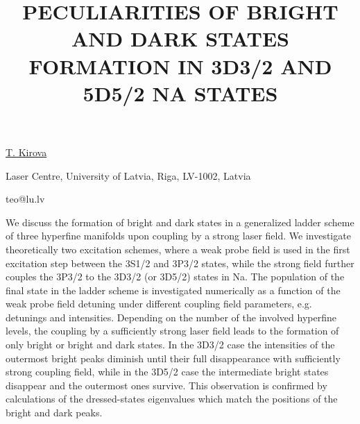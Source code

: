 \title{PECULIARITIES OF BRIGHT AND DARK STATES FORMATION IN 3D3/2 AND 5D5/2  NA STATES}

\underline{T. Kirova}

{\normalsize{\vspace{-4mm}
Laser Centre,
University of Latvia,
Riga, LV-1002,
Latvia

\email teo@lu.lv}}

We discuss the formation of bright and dark states in a generalized ladder scheme of three hyperfine
manifolds upon coupling by a strong laser field.  We investigate theoretically two excitation
schemes, where a weak probe field is used in the first excitation step between the 3S1/2 and 3P3/2
states, while the strong field further couples the 3P3/2 to the 3D3/2 (or 3D5/2) states in Na. The
population of the final state in the ladder scheme is investigated numerically as a function of the
weak probe field detuning under different coupling field parameters, e.g. detunings and intensities.
Depending on the number of the involved hyperfine levels, the coupling by a sufficiently strong
laser field leads to the formation of only bright or bright and dark states. In the 3D3/2 case the
intensities of the outermost bright peaks diminish until their full disappearance with sufficiently
strong coupling field, while in the 3D5/2 case the intermediate bright states disappear and the
outermost ones survive. This observation is confirmed by calculations of the dressed-states
eigenvalues which match the positions of the bright and dark peaks. 

\vspace{\baselineskip}
